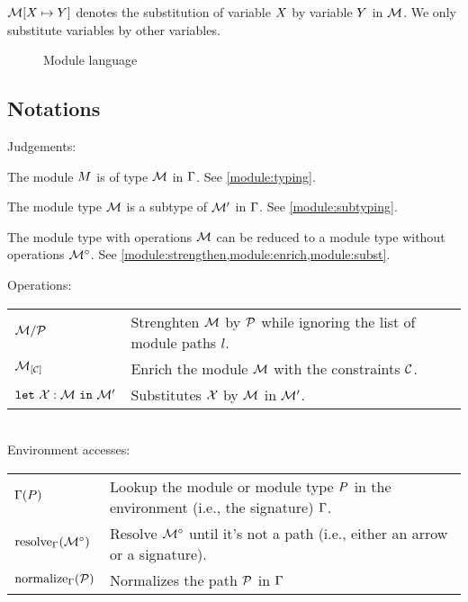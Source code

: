 $\mathcal M\!\left[X \mapsto Y\right]$ denotes the substitution of variable $X$ by variable $Y$ in $\mathcal M$. We only substitute variables by other variables.

\begin{figure}[!hb]
  
  \caption{Module language}
  \label{grammar}
\end{figure}


\subsection{Notations}

Judgements:\\
\begin{description}[align=right, leftmargin=3.5cm]
\item[$\wtm{\E}{\im}{\iM}$ :]
  The module $M$ is of type $\mathcal M$ in $\Gamma$.
  See \cref{module:typing}.
\item[$\submod{\E}{\iM}{\iM'}{\iM_r}$ :]
  The module type $\mathcal M$ is a subtype of $\mathcal M'$ in $\Gamma$.
  See \cref{module:subtyping}.
\item[$\Oreduce{\E}{\iM} = \iMO$ :]
  The module type with operations $\mathcal M$ can be reduced to a module
  type without operations ${\mathcal M^\circ}$.
  See \cref{module:strengthen,module:enrich,module:subst}.
\end{description}

Operations:\\
\begin{tabular}{ll}
  $\mathcal M/\mathcal P$
  & Strenghten $\mathcal M$ by $\mathcal P$ while ignoring the list of module paths $l$.\\
  ${\mathcal M}_{\left[\mathcal C\right]}$
  & Enrich the module $\mathcal M$ with the constraints $\mathcal C$.\\
  $\mathtt{let}\ \mathcal X : \mathcal M\ \mathtt{in}\ \mathcal M'$
  & Substitutes $\mathcal X$ by $\mathcal M$ in $\mathcal M'$.
\end{tabular}\\

Environment accesses:\\
\begin{tabular}{ll}
  $\Gamma(P)$
  & Lookup the module or module type $P$ in the environment (i.e., the signature)
    $\Gamma$.\\
  $\operatorname{resolve}_{\Gamma}({\mathcal M^\circ})$
  & Resolve ${\mathcal M^\circ}$ until it's not a path (i.e., either an arrow or a signature).\\
  $\operatorname{normalize}_{\Gamma}(\mathcal P)$
  & Normalizes the path $\mathcal P$ in $\Gamma$
\end{tabular}

